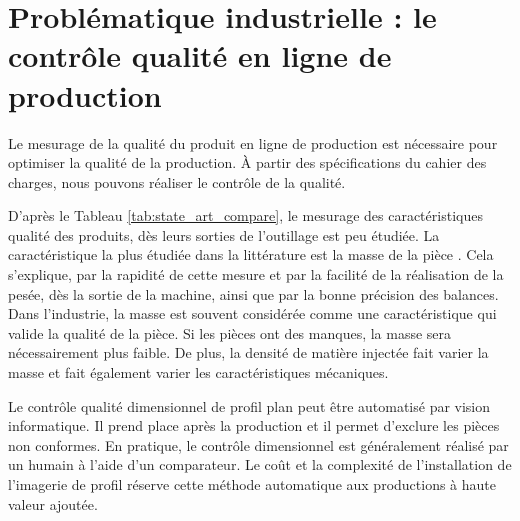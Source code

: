 
\section{Problématique industrielle : le contrôle qualité en ligne de production} \label{sec:research_objectives}
Le mesurage de la qualité du produit en ligne de production est nécessaire pour optimiser la qualité de la production.
À partir des spécifications du cahier des charges, nous pouvons réaliser le contrôle de la qualité.

D'après le Tableau \ref{tab:state_art_compare}, le mesurage des caractéristiques qualité des produits, dès leurs sorties de l'outillage est peu étudiée.
La caractéristique la plus étudiée dans la littérature est la masse de la pièce \cite{schnerr-haselbarth_automation_2000, fournier_conduite_2006, michaeli_online_2009}.
Cela s'explique, par la rapidité de cette mesure et par la facilité de la réalisation de la pesée, dès la sortie de la machine, ainsi que par la bonne précision des balances.
Dans l'industrie, la masse est souvent considérée comme une caractéristique qui valide la qualité de la pièce.
Si les pièces ont des manques, la masse sera nécessairement plus faible.
De plus, la densité de matière injectée fait varier la masse et fait également varier les caractéristiques mécaniques.

Le contrôle qualité dimensionnel de profil plan peut être automatisé par vision informatique.
Il prend place après la production et il permet d'exclure les pièces non conformes.
En pratique, le contrôle dimensionnel est généralement réalisé par un humain à l'aide d'un comparateur.
Le coût et la complexité de l'installation de l'imagerie de profil réserve cette méthode automatique aux productions à haute valeur ajoutée.

